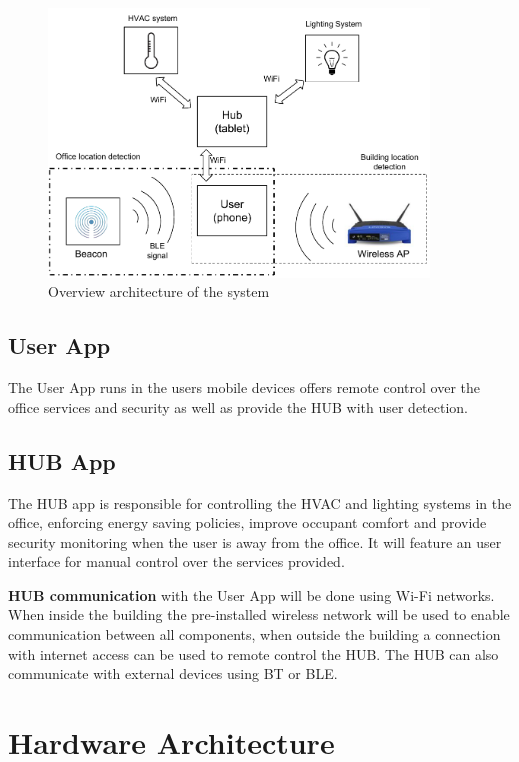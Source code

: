 \begin{figure}[h]
\centering
\includegraphics[width=0.9\textwidth]{Figures/harware_arch}
\caption{Overview architecture of the system}
\label{software1}
\end{figure}


\subsection{User App}

The User App runs in the users mobile devices offers remote control over the office services and security as well as provide the HUB with user detection.



\subsection{HUB App}

The HUB app is responsible for controlling the HVAC and lighting systems in the office, enforcing energy saving policies, improve occupant comfort and provide security monitoring when the user is away from the office.
It will feature an user interface for manual control over the services provided.


\textbf{HUB communication} with the User App will be done using Wi-Fi networks. When inside the building the pre-installed wireless network will be used to enable communication between all components, when outside the building a connection with internet access can be used to remote control the HUB. The HUB can also communicate with external devices using \ac{BT} or \ac{BLE}.


\section{Hardware Architecture}\label{architecture3} 

